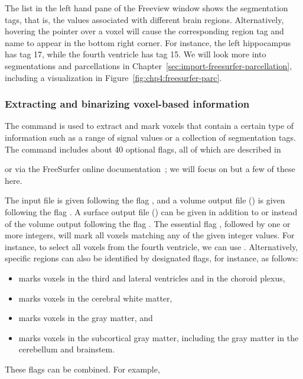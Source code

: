 \noindent The list in the left hand pane of the Freeview window shows
the segmentation tags, that is, the values associated with different brain
regions. Alternatively, hovering the pointer over a voxel will
cause the corresponding region tag and name to appear in the bottom
right corner. For instance, the left hippocampus has tag 17, while the
fourth ventricle has tag 15. We will look more into segmentations and
parcellations in Chapter~\ref{sec:import-freesurfer-parcellation},
including a visualization in Figure~\ref{fig:chp4:freesurfer-parc}.

\subsubsection*{Extracting and binarizing voxel-based information}
The {\freesurfer} command  is used to extract and
mark voxels that contain a certain type of information such as a range
of signal values or a collection of segmentation tags. The command
includes about 40 optional flags, all of which are described in

\noindent or via the FreeSurfer online
documentation~\cite{freesurfer-wiki}; we will focus on but a few of
these here.

The input file is given following the flag , and a volume
output file () is given following the flag . A
surface output file () can be given in addition to or
instead of the volume output following the flag . The
essential flag , followed by one or more integers, will mark
all voxels matching any of the given integer values. For instance, to
select all voxels from the fourth ventricle, we can use . Alternatively, specific regions can also be identified by
designated flags, for instance, as follows:
\begin{itemize}
\item {} marks voxels in the third and lateral ventricles and in the choroid plexus,
\item {} marks voxels in the cerebral white matter,
\item {} marks voxels in the gray matter, and  
\item {} marks voxels in the subcortical gray matter, including the gray matter in the cerebellum and brainstem.  
\end{itemize}
These flags can be combined. For example,

